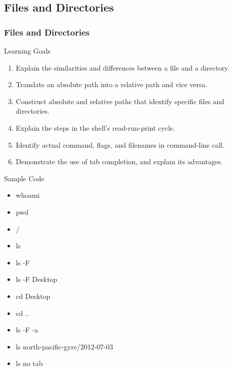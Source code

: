 \documentclass{beamer}
\begin{document}

\subsection*{Files and Directories}


\begin{frame}
\frametitle{Files and Directories}
\small{
\begin{block}{Learning Goals}
\begin{enumerate}
\item    Explain the similarities and differences between a file and a directory.
\item    Translate an absolute path into a relative path and vice versa.
\item    Construct absolute and relative paths that identify specific files and directories.
\item    Explain the steps in the shell's read-run-print cycle.
\item    Identify actual command, flags, and filenames in command-line call.
\item    Demonstrate the use of tab completion, and explain its advantages.
\end{enumerate}
\end{block}}
\begin{block}{Sample Code}
\begin{multicols}{3}
\begin{itemize}
\item whoami
\item pwd
\item /
\item ls
\item ls -F
\item ls -F Desktop
\item cd Desktop
\item cd ..
\item ls -F -a
\item ls north-pacific-gyre/2012-07-03
\item ls no tab
\end{itemize}
\end{multicols}
\end{block}
\end{frame}
\end{document}
